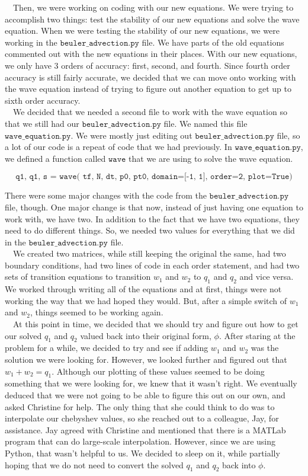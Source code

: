 $\quad$Then, we were working on coding with our new equations. We were trying to accomplish two things: test the stability of our new equations and solve the wave equation. When we were testing the stability of our new equations, we were working in the $\texttt{beuler\_advection.py}$ file. We have parts of the old equations commented out with the new equations in their places. With our new equations, we only have 3 orders of accuracy: first, second, and fourth. Since fourth order accuracy is still fairly accurate, we decided that we can move onto working with the wave equation instead of trying to figure out another equation to get up to sixth order accuracy. \\

$\quad$We decided that we needed a second file to work with the wave equation so that we still had our $\texttt{beuler\_advection.py}$ file. We named this file $\texttt{wave\_equation.py}$. We were mostly just editing out $\texttt{beuler\_advection.py}$ file, so a lot of our code is a repeat of code that we had previously. In $\texttt{wave\_equation.py}$, we defined a function called $\texttt{wave}$ that we are using to solve the wave equation. 

$$\texttt{q1, q1, s = wave( tf, N, dt, p0, pt0,  domain=[-1, 1], order=2, plot=True)}$$ 

There were some major changes with the code from the $\texttt{beuler\_advection.py}$ file, though. One major change is that now, instead of just having one equation to work with, we have two. In addition to the fact that we have two equations, they need to do different things. So, we needed two values for everything that we did in the $\texttt{beuler\_advection.py}$ file. \\
$\quad$We created two matrices, while still keeping the original the same, had two boundary conditions, had two lines of code in each order statement, and had two sets of transition equations to transition $w_1$ and $w_2$ to $q_1$ and $q_2$ and vice versa. We worked through writing all of the equations and at first, things were not working the way that we had hoped they would. But, after a simple switch of $w_1$ and $w_2$, things seemed to be working again. \\
$\quad$At this point in time, we decided that we should try and figure out how to get our solved $q_1$ and $q_2$ valued back into their original form, $\phi$. After staring at the problem for a while, we decided to try and see if adding $w_1$ and $w_2$ was the solution we were looking for. However, we looked further and figured out that $w_1 + w_2 = q_1$. Although our plotting of these values seemed to be doing something that we were looking for, we knew that it wasn't right. We eventually deduced that we were not going to be able to figure this out on our own, and asked Christine for help. The only thing that she could think to do was to interpolate our chebyshev values, so she reached out to a colleague, Jay, for assistance. Jay agreed with Christine and mentioned that there is a MATLab program that can do large-scale interpolation. However, since we are using Python, that wasn't helpful to us. We decided to sleep on it, while partially hoping that we do not need to convert the solved $q_1$ and $q_2$ back into $\phi$.
